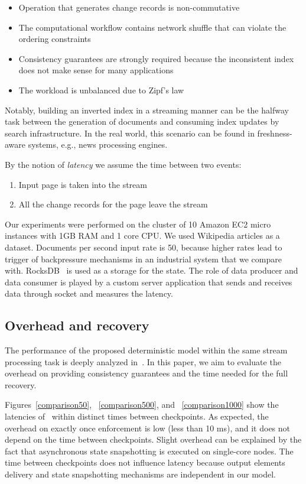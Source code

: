 \begin{itemize}
    \item Operation that generates change records is non-commutative
    \item The computational workflow    contains network shuffle that can violate the ordering constraints
    \item Consistency guarantees are strongly required because the inconsistent index does not make sense for many applications
    \item The workload is unbalanced due to Zipf's law
\end{itemize}

Notably, building an inverted index in a streaming manner can be the halfway task between the generation of documents and consuming index updates by search infrastructure. In the real world, this scenario can be found in freshness-aware systems, e.g., news processing engines.

By the notion of {\it latency} we assume the time between two events: 

\begin{enumerate}
    \item Input page is taken into the stream
    \item All the change records for the page leave the stream
\end{enumerate}

Our experiments were performed on the cluster of 10 Amazon EC2 micro instances with 1GB RAM and 1 core CPU. We used Wikipedia articles as a dataset. Documents per second input rate is 50, because higher rates lead to trigger of backpressure mechanisms in an industrial system that we compare with. RocksDB~\cite{rocksdb} is used as a storage for the state. The role of data producer and data consumer is played by a custom server application that sends and receives data through socket and measures the latency.

\subsection{Overhead and recovery}
The performance of the proposed deterministic model within the same stream processing task is deeply analyzed in~\cite{we2018seim}. In this paper, we aim to evaluate the overhead on providing consistency guarantees and the time needed for the full recovery.

Figures~\ref{comparison50}, ~\ref{comparison500}, and ~\ref{comparison1000} show the latencies of \FlameStream\ within distinct times between checkpoints. As expected, the overhead on exactly once enforcement is low (less than 10 ms), and it does not depend on the time between checkpoints. Slight overhead can be explained by the fact that asynchronous state snapshotting is executed on single-core nodes. The time between checkpoints does not influence latency because output elements delivery and state snapshotting mechanisms are independent in our model.

